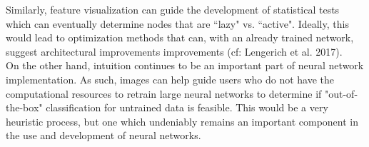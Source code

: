 \documentclass[12pt]{article}
\begin{document}
Similarly, feature visualization can guide the development of statistical tests which can eventually determine nodes that are ``lazy" vs. ``active". Ideally, this would lead to optimization methods that can, with an already trained network, suggest architectural improvements improvements (cf: Lengerich et al. 2017)\cite{resampling}. \\

On the other hand, intuition continues to be an important part of neural network implementation. As such, images can help guide users who do not have the computational resources to retrain large neural networks to determine if "out-of-the-box" classification for untrained data is feasible. This would be a very heuristic process, but one which undeniably remains an important component in the use and development of neural networks. \\

\pagebreak



\end{document}
